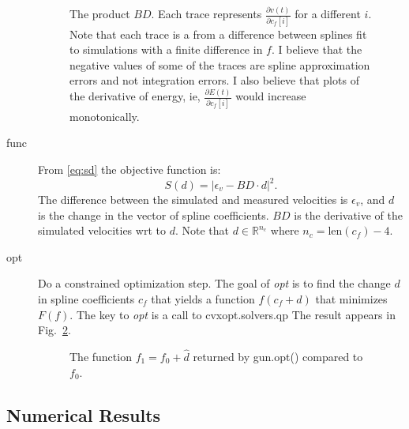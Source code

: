 \documentclass[11pt]{article}
\newcommand{\field}[1]{\mathbb{#1}}
\newcommand\REAL{\field{R}}
\newcommand\epv{\epsilon_v}
\begin{document}
\begin{description}
\begin{figure}
    \caption{The product $B D$.  Each trace represents
      $\frac{\partial v(t)}{\partial c_f[i]}$ for a different $i$.
      Note that each trace is a from a difference between splines fit
      to simulations with a finite difference in $f$.  I believe that
      the negative values of some of the traces are spline
      approximation errors and not integration errors.  I also believe
      that plots of the derivative of energy, ie,
      $\frac{\partial E(t)}{\partial c_f[i]}$ would increase
      monotonically.}
    \label{fig:BD_test}
  \end{figure}
\item[func] From \eqref{eq:sd} the objective function is:
  \begin{equation*}
    S(d) = \left| \epv - BD\cdot d \right|^2.
  \end{equation*}
  The difference between the simulated and measured velocities is
  $\epv$, and $d$ is the change in the vector of spline
  coefficients.  $BD$ is the derivative of the simulated velocities
  wrt to $d$.  Note that $d\in \REAL^{n_c}$ where $n_c = \text{len}(c_f)-4$.
\item[opt] Do a constrained optimization step.  The goal of \emph{opt}
  is to find the change $d$ in spline coefficients $c_f$ that yields a
  function $f(c_f+d)$ that minimizes $F(f)$.  The key to \emph{opt} is
  a call to cvxopt.solvers.qp
   The result appears in
  Fig.~\ref{fig:opt_result}.
  \begin{figure}
    \centering
    \caption{The function $f_1 = f_0 + \hat d$ returned by gun.opt()
      compared to $f_0$.}
    \label{fig:opt_result}
  \end{figure}
\end{description}

\subsection{Numerical Results}
\label{sec:numerical-results}
\end{document}
